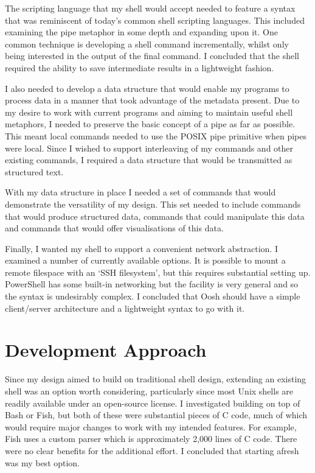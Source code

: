 \documentclass[12pt,twoside,notitlepage]{report}
\begin{document}
The scripting language that my shell would accept needed to feature a
syntax that was reminiscent of today's common shell scripting
languages. This included examining the pipe metaphor in some depth and
expanding upon it. One common technique is developing a shell command
incrementally, whilst only being interested in the output of the final
command. I concluded that the shell required the ability to save
intermediate results in a lightweight fashion.

I also needed to develop a data structure that would enable my
programs to process data in a manner that took advantage of the
metadata present. Due to my desire to work with current programs and
aiming to maintain useful shell metaphors, I needed to preserve the
basic concept of a pipe as far as possible. This meant local commands
needed to use the POSIX pipe primitive when pipes were local. Since I
wished to support interleaving of my commands and other existing
commands, I required a data structure that would be transmitted as
structured text.

With my data structure in place I needed a set of commands that would
demonstrate the versatility of my design. This set needed to include
commands that would produce structured data, commands that could
manipulate this data and commands that would offer visualisations of
this data.

Finally, I wanted my shell to support a convenient network
abstraction. I examined a number of currently available options. It is
possible to mount a remote filespace with an `SSH filesystem', but
this requires substantial setting up. PowerShell has some built-in
networking but the facility is very general and so the syntax is
undesirably complex. I concluded that Oosh should have a simple
client/server architecture and a lightweight syntax to go with it.

\section{Development Approach}
Since my design aimed to build on traditional shell design, extending
an existing shell was an option worth considering, particularly since
most Unix shells are readily available under an open-source license. I
investigated building on top of Bash or Fish, but both of these were
substantial pieces of C code, much of which would require major
changes to work with my intended features. For example, Fish uses a
custom parser which is approximately 2,000 lines of C code. There were
no clear benefits for the additional effort. I concluded that
starting afresh was my best option.
\end{document}
